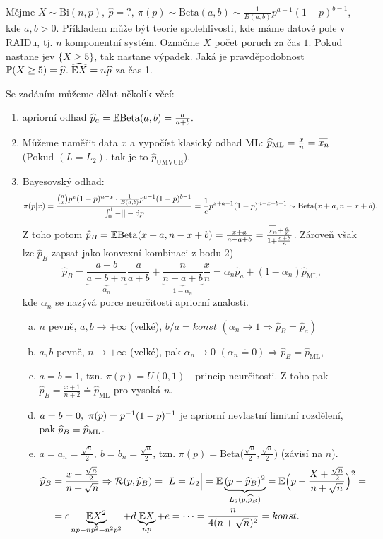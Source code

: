 \begin{example}
	Mějme $X\sim \mathrm{Bi}(n,p),~\widehat{p}=?,~\pi(p)\sim\mathrm{Beta}(a,b)\sim\frac{1}{B(a,b)}p^{a-1}(1-p)^{b-1}$, kde $a,b>0$. Příkladem může být teorie spolehlivosti, kde máme datové pole v RAIDu, tj. $n$ komponentní systém. Označme $X$ počet poruch za čas $1$. Pokud nastane jev $\{X\geq5\}$, tak nastane výpadek. Jaká je pravděpodobnost $\mathbb{P}(X\geq5)=\widehat{p}$. $\widehat{\mathbb{E} X}=n\widehat{p}$ za čas 1.
	
	Se zadáním můžeme dělat několik věcí:\begin{enumerate}[1)]
		\item apriorní odhad $\widehat{p}_a=\mathbb{E}\mathrm{Beta}(a,b)=\frac{a}{a+b}.$
		\item Můžeme naměřit data $x$ a vypočíst klasický odhad ML: $\widehat{p}_\mathrm{ML}=\frac{x}{n}=\oxnn$ (Pokud $(L=L_2)$, tak je to $\widehat{p}_\mathrm{UMVUE}$).
		\item Bayesovský odhad: $$\pi(p|x)=\frac{\binom{n}{x}p^x(1-p)^{n-x}\cdot\frac{1}{B(a,b)}p^{a-1}(1-p)^{b-1}}{\int_{0}^{1}-||-\mathrm{d} p}=\frac{1}{c}p^{x+a-1}(1-p)^{n-x+b-1}\sim\mathrm{Beta}(x+a,n-x+b).$$
		Z toho potom $\widehat{p}_B=\E \mathrm{Beta}(x+a,n-x+b)=\frac{x+a}{n+a+b}=\frac{\oxnn+\frac{a}{n}}{1+\frac{a+b}{n}}$. Zároveň však lze $\widehat{p}_B$ zapsat jako konvexní kombinaci z bodu 2)
		$$ \widehat{p}_B=\underbrace{\frac{a+b}{a+b+n}}_{\alpha_n}\frac{a}{a+b}+\underbrace{\frac{n}{n+a+b}}_{1-\alpha_n}\frac{x}{n}=\alpha_n\widehat{p}_a+(1-\alpha_n)\widehat{p}_\mathrm{ML},$$ kde $\alpha_n$ se nazývá porce neurčitosti apriorní znalosti.
		\begin{enumerate}[a)]
			\item $n$ pevně, $a,b\to+\infty$ (velké), $b/a=konst$ $(\alpha_n\to1\Rightarrow\widehat{p}_B=\widehat{p}_a)$
			\item $a,b$ pevně, $n\to+\infty$ (velké), pak $\alpha_n\to0$ $(\alpha_n\doteq0)\Rightarrow\widehat{p}_B=\widehat{p}_\mathrm{ML}$,
			\item $a=b=1$, tzn. $\pi(p)=U(0,1)$ - princip neurčitosti. Z toho pak $\widehat{p}_B=\frac{x+1}{n+2}\doteq \widehat{p}_\mathrm{ML}$ pro vysoká $n$.
			\item $a=b=0,~\pi(p)=p^{-1}(1-p)^{-1}$ je apriorní nevlastní limitní rozdělení, pak $\widehat{p}_B=\widehat{p}_\mathrm{ML}$.
			\item $a=a_n=\frac{\sqrt{n}}{2},~b=b_n=\frac{\sqrt{n}}{2}$, tzn. $\pi(p)=\mathrm{Beta}\big(\frac{\sqrt{n}}{2},\frac{\sqrt{n}}{2}\big)$ (závisí na $n$).
			\[
			\begin{split}
			\pB&=\frac{x+\frac{\sqrt{n}}{2}}{n+\sqrt{n}}\Rightarrow \RF(p,\pB)=\Big|L=L_2\Big|=\E \underbrace{(p-\widehat{p}_B)^2}_{L_2(p,\pB)}=\E\Big(p-\frac{X+\frac{\sqrt{n}}{2}}{n+\sqrt{n}}\Big)^2=\\&=c\underbrace{\E X^2}_{np-np^2+n^2p^2}+d \underbrace{\E X}_{np}+e=\dots=\frac{n}{4(n+\sqrt{n})^2}=konst.

\end{split}\]
\end{enumerate}
\end{enumerate}
\end{example}
